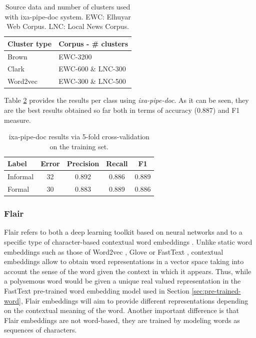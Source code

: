 \documentclass[information,article,submit,moreauthors,pdftex,10pt,a4paper]{Definitions/mdpi}
\begin{document}
\begin{table}[H]
  \centering
  \begin{tabular}{l|l} \hline
    Cluster type & Corpus - \# clusters\\ \hline \hline
    Brown & EWC-3200 \\
    Clark & EWC-600 \& LNC-300  \\
    Word2vec & EWC-300 \& LNC-500\\ \hline
  \end{tabular}
  \caption{Source data and number of clusters used with ixa-pipe-doc system. EWC: Elhuyar Web Corpus. LNC: Local News Corpus.}
  \label{tab:clusters}
\end{table}


Table \ref{tab:ixa-ml-garapen} provides the results per class using \emph{ixa-pipe-doc}. As it can be seen, they are the best results obtained so far both in terms of accuracy (0.887) and F1 measure.

\begin{table}[H]
  \centering
  \begin{tabular}{lcccc}
    \hline
    Label & Error & Precision & Recall & F1\\ \hline \hline
    Informal & 32 & 0.892  & 0.886  & 0.889 \\
    Formal & 30 & 0.883 & 0.889 & 0.886 \\ \hline
  \end{tabular}
  \caption{ixa-pipe-doc results via 5-fold cross-validation on the training set.}
  \label{tab:ixa-ml-garapen}
\end{table}


\subsubsection{Flair}\label{sec:neural-architecture}

Flair refers to both a deep learning toolkit based on neural networks and to a specific type of character-based contextual word embeddings \cite{akbik2018contextual}. Unlike static word embeddings such as those of Word2vec \cite{mikolov2013distributed}, Glove \cite{pennington-etal-2014-glove} or FastText \cite{mikolov-etal-2018-advances}, contextual embeddings allow to obtain word representations in a vector space taking into account the sense of the word given the context in which it appears. Thus, while a polysemous word would be given a unique real valued representation in the FastText pre-trained word embedding model used in Section \ref{sec:pre-trained-word}, Flair embeddings will aim to provide different representations depending on the contextual meaning of the word. Another important difference is that Flair embeddings are not word-based, they are trained by modeling words as sequences of characters.
\end{document}
